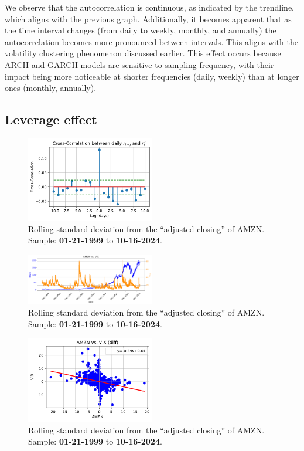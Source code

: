 \documentclass{article}
\begin{document}
\noindent We observe that the autocorrelation is continuous, as indicated by the trendline, 
which aligns with the previous graph. 
Additionally, it becomes apparent that as the time interval changes (from daily to weekly, monthly, and annually) 
the autocorrelation becomes more pronounced between intervals. 
This aligns with the volatility clustering phenomenon discussed earlier. 
This effect occurs because ARCH and GARCH models are sensitive to sampling frequency, 
with their impact being more noticeable at shorter frequencies (daily, weekly) than at longer ones (monthly, annually).

\subsection{Leverage effect}

\begin{figure}[H]
    \centering
    \includegraphics[width=0.5\textwidth]{Img/Fact8_CrossCorr_r_r2.pdf}
    \caption{Rolling standard deviation from the “adjusted closing” of AMZN. Sample: \textbf{01-21-1999} to \textbf{10-16-2024}.}
    \label{fig:Rolling_std_dev_2}
\end{figure}

\begin{figure}[H]
    \centering
    \includegraphics[width=0.5\textwidth]{Img/Fact8.pdf}
    \caption{Rolling standard deviation from the “adjusted closing” of AMZN. Sample: \textbf{01-21-1999} to \textbf{10-16-2024}.}
    \label{fig:Rolling_std_dev_3}
\end{figure}

\begin{figure}[H]
    \centering
    \includegraphics[width=0.5\textwidth]{Img/Fact_8_3AMZN_.pdf}
    \caption{Rolling standard deviation from the “adjusted closing” of AMZN. Sample: \textbf{01-21-1999} to \textbf{10-16-2024}.}
    \label{fig:Rolling_std_dev}
\end{figure}
\end{document}
